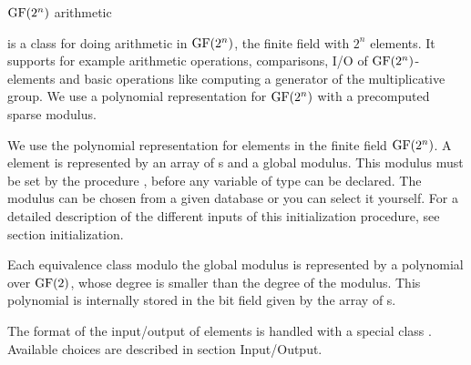 


\NAME

 \dotfill $\mathrm{GF}(2^n)$ arithmetic



\ABSTRACT

 is a class for doing arithmetic in $\mathrm{GF}(2^n)$, the finite field with $2^n$
elements.  It supports for example arithmetic operations, comparisons, I/O of
$\mathrm{GF}(2^n)$-elements and basic operations like computing a generator of the multiplicative group.
We use a polynomial representation for $\mathrm{GF}(2^n)$ with a precomputed sparse modulus.



\DESCRIPTION

We use the polynomial representation for elements in the finite field $\mathrm{GF}(2^n)$.  A 
element is represented by an array of s and a global modulus.  This modulus
must be set by the procedure , before any variable of type  can be
declared.  The modulus can be chosen from a given database or you can select it yourself.  For a
detailed description of the different inputs of this initialization procedure, see section
initialization.

Each equivalence class modulo the global modulus is represented by a polynomial over $\mathrm{GF}(2)$,
whose degree is smaller than the degree of the modulus.  This polynomial is internally stored in
the bit field given by the array of s.

The format of the input/output of  elements is handled with a special class
.  Available choices are described in section Input/Output.

